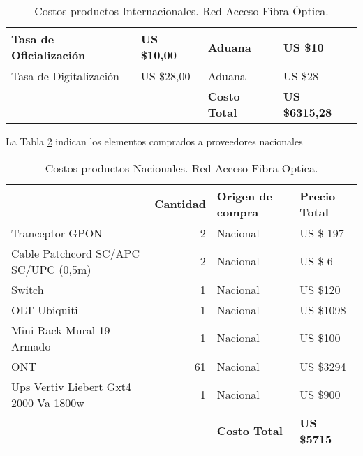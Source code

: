 \begin{table}[H]
\begin{tabular}{rr|l|l|}
    \multicolumn{1}{|l|}{Tasa de Oficialización} & \multicolumn{1}{l|}{US \$10,00} & Aduana & US \$10 \bigstrut\\
    \hline
    \multicolumn{1}{|l|}{Tasa de Digitalización} & \multicolumn{1}{l|}{US \$28,00} & Aduana & US \$28 \bigstrut\\
    \hline
          &       & \cellcolor[HTML]{C5D9F1}\textbf{Costo Total} & \cellcolor[HTML]{C5D9F1}\textbf{US \$6315,28} \bigstrut\\
\cline{3-4}
    \end{tabular}%
   \caption{Costos productos Internacionales. Red Acceso Fibra Óptica.}
  \label{tab:Costosbf}%
\end{table}%







La Tabla \ref{tab:Costosbc} indican los elementos comprados a proveedores nacionales





\begin{table}[H]
  \centering
    \begin{tabular}{|r|r|l|l|}
    \hline
    \rowcolor[HTML]{C5D9F1} \multicolumn{1}{|l|}{\textbf{Descripción }} & \multicolumn{1}{l|}{\textbf{Cantidad}} & \textbf{Origen de compra} & \textbf{Precio Total} \bigstrut\\
    \hline
    \multicolumn{1}{|l|}{Tranceptor GPON} & 2     & Nacional & US \$ 197 \bigstrut\\
    \hline
    \multicolumn{1}{|l|}{Cable Patchcord SC/APC SC/UPC (0,5m)} & 2     & Nacional & US \$ 6 \bigstrut\\
    \hline
    \multicolumn{1}{|l|}{Switch} & 1     & Nacional & US \$120 \bigstrut\\
    \hline
    \multicolumn{1}{|l|}{OLT Ubiquiti} & 1     & Nacional & US \$1098 \bigstrut\\
    \hline
    \multicolumn{1}{|l|}{Mini Rack Mural 19 Armado} & 1     & Nacional & US \$100 \bigstrut\\
    \hline
    \multicolumn{1}{|l|}{ONT} & 61    & Nacional & US \$3294 \bigstrut\\
    \hline
    \multicolumn{1}{|l|}{Ups Vertiv Liebert Gxt4 2000 Va 1800w} & 1     & Nacional & US \$900 \bigstrut\\
    \hline
    \rowcolor[HTML]{C5D9F1}       &       & \textbf{Costo Total} & \textbf{US \$5715} \bigstrut\\
    \hline
    \end{tabular}%
  \caption{Costos productos Nacionales. Red Acceso Fibra Optica.}
  \label{tab:Costosbc}%
\end{table}%





